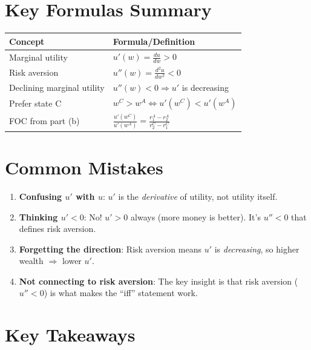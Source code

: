 \documentclass[12pt]{article}
\begin{document}
\newpage

\section*{Key Formulas Summary}

\begin{center}
\begin{tabular}{|l|l|}
\hline
\textbf{Concept} & \textbf{Formula/Definition} \\
\hline
Marginal utility & $u'(w) = \frac{du}{dw} > 0$ \\
\hline
Risk aversion & $u''(w) = \frac{d^2u}{dw^2} < 0$ \\
\hline
Declining marginal utility & $u''(w) < 0 \Rightarrow u'$ is decreasing \\
\hline
Prefer state C & $w^C > w^A \Leftrightarrow u'(w^C) < u'(w^A)$ \\
\hline
FOC from part (b) & $\displaystyle\frac{u'(w^C)}{u'(w^A)} = \frac{r_1^A - r_2^A}{r_2^C - r_1^C}$ \\
\hline
\end{tabular}
\end{center}

\section*{Common Mistakes}

\begin{enumerate}[leftmargin=2cm, itemsep=1em]
    \item \textbf{Confusing $u'$ with $u$}: $u'$ is the \textit{derivative} of utility, not utility itself.

    \item \textbf{Thinking $u' < 0$}: No! $u' > 0$ always (more money is better). It's $u'' < 0$ that defines risk aversion.

    \item \textbf{Forgetting the direction}: Risk aversion means $u'$ is \textit{decreasing}, so higher wealth $\Rightarrow$ lower $u'$.

    \item \textbf{Not connecting to risk aversion}: The key insight is that risk aversion ($u'' < 0$) is what makes the ``iff'' statement work.
\end{enumerate}

\section*{Key Takeaways}
\end{document}
